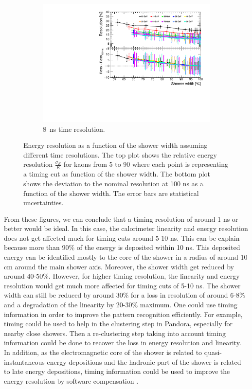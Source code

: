 \begin{figure}[htbp!]
\begin{subfigure}[t]{0.6\textwidth}
    \centering
    \includegraphics[width=1\linewidth]{../Thesis_Plots/ILD/Smearing_8ns/Plots/ShowerWidth_Resolution_Smearing3}
    \caption{\SI{8}{\nano\second} time resolution.} \label{fig:WidthReso8ns}
  \end{subfigure}
  \caption{Energy resolution as a function of the shower width assuming different time resolutions. The top plot shows the relative energy resolution $\frac{\sigma_{E}}{E}$ for kaons from 5 to 90 \GeV where each point is representing a timing cut as function of the shower width. The bottom plot shows the deviation to the nominal resolution at 100 ns as a function of the shower width. The error bars are statistical uncertainties.}
\end{figure}

From these figures, we can conclude that a timing resolution of around 1 ns or better would be ideal. In this case, the calorimeter linearity and energy resolution does not get affected much for timing cuts around 5-10 ns. This can be explain because more than 90\% of the energy is deposited within 10 ns. This deposited energy can be identified mostly to the core of the shower in a radius of around 10 cm around the main shower axis. Moreover, the shower width get reduced by around 40-50\%. However, for higher timing resolution, the linearity and energy resolution would get much more affected for timing cuts of 5-10 ns. The shower width can still be reduced by around 30\% for a loss in resolution of around 6-8\% and a degradation of the linearity by 20-30\% maximum. One could use timing information in order to improve the pattern recognition efficiently. For example, timing could be used to help in the clustering step in Pandora, especially for nearby close showers. Then a re-clustering step taking into account timing information could be done to recover the loss in energy resolution and linearity. In addition, as the electromagnetic core of the shower is related to quasi-instantaneous energy depositions and the hadronic part of the shower is related to late energy depositions, timing information could be used to improve the energy resolution by software compensation \cite{Benaglia2016}.


